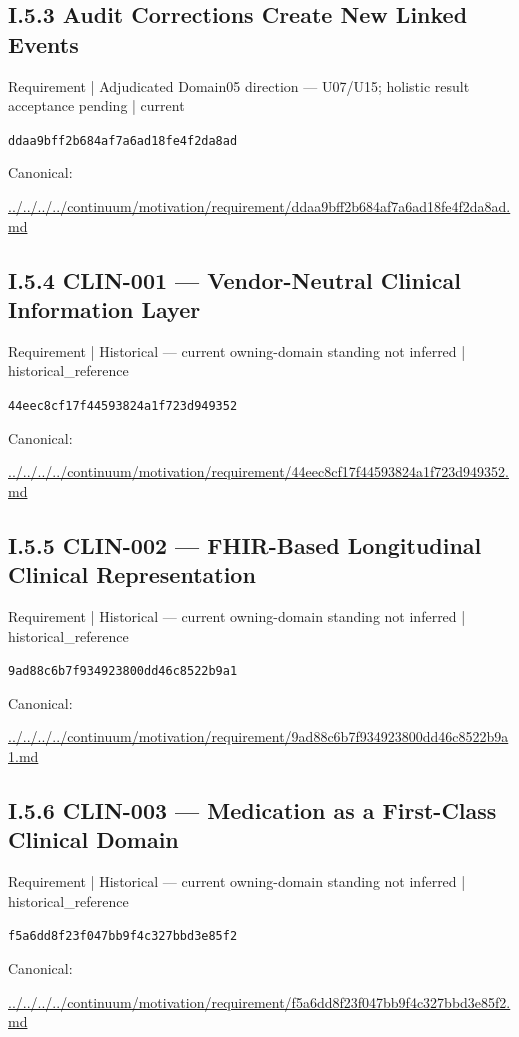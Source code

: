 \documentclass[10pt,a4paper]{article}
\begin{document}
\subsection*{I.5.3 Audit Corrections Create New Linked Events}
{\small Requirement | Adjudicated Domain05 direction — U07/U15; holistic result acceptance pending | current}\par
\texttt{ddaa9bff2b684af7a6ad18fe4f2da8ad}\par
Canonical: \par
{\footnotesize\url{../../../../continuum/motivation/requirement/ddaa9bff2b684af7a6ad18fe4f2da8ad.md}}\par
\subsection*{I.5.4 CLIN-001 — Vendor-Neutral Clinical Information Layer}
{\small Requirement | Historical — current owning-domain standing not inferred | historical\_reference}\par
\texttt{44eec8cf17f44593824a1f723d949352}\par
Canonical: \par
{\footnotesize\url{../../../../continuum/motivation/requirement/44eec8cf17f44593824a1f723d949352.md}}\par
\subsection*{I.5.5 CLIN-002 — FHIR-Based Longitudinal Clinical Representation}
{\small Requirement | Historical — current owning-domain standing not inferred | historical\_reference}\par
\texttt{9ad88c6b7f934923800dd46c8522b9a1}\par
Canonical: \par
{\footnotesize\url{../../../../continuum/motivation/requirement/9ad88c6b7f934923800dd46c8522b9a1.md}}\par
\subsection*{I.5.6 CLIN-003 — Medication as a First-Class Clinical Domain}
{\small Requirement | Historical — current owning-domain standing not inferred | historical\_reference}\par
\texttt{f5a6dd8f23f047bb9f4c327bbd3e85f2}\par
Canonical: \par
{\footnotesize\url{../../../../continuum/motivation/requirement/f5a6dd8f23f047bb9f4c327bbd3e85f2.md}}\par
\end{document}
